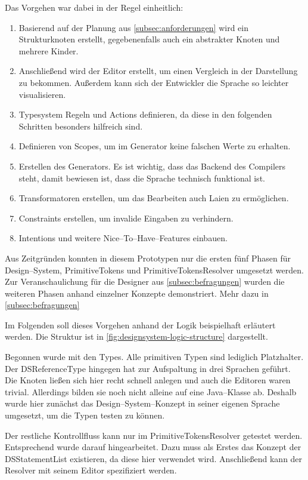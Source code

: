 Das Vorgehen war dabei in der Regel einheitlich:
\begin{enumerate}
    \item Basierend auf der Planung aus \autoref{subsec:anforderungen} wird ein Strukturknoten erstellt, gegebenenfalls auch ein abstrakter Knoten und mehrere Kinder.
    \item Anschließend wird der Editor erstellt, um einen Vergleich in der Darstellung zu bekommen.
    Außerdem kann sich der Entwickler die Sprache so leichter visualisieren.
    \item Typesystem Regeln und Actions definieren, da diese in den folgenden Schritten besonders hilfreich sind.
    \item Definieren von Scopes, um im Generator keine falschen Werte zu erhalten.
    \item Erstellen des Generators.
    Es ist wichtig, dass das Backend des Compilers steht, damit bewiesen ist, dass die Sprache technisch funktional ist.
    \item Transformatoren erstellen, um das Bearbeiten auch Laien zu ermöglichen.
    \item Constraints erstellen, um invalide Eingaben zu verhindern.
    \item Intentions und weitere Nice--To--Have--Features einbauen.
\end{enumerate}

Aus Zeitgründen konnten in diesem Prototypen nur die ersten fünf Phasen für Design--System, PrimitiveTokens und PrimitiveTokensResolver umgesetzt werden.
Zur Veranschaulichung für die Designer aus \autoref{subsec:befragungen} wurden die weiteren Phasen anhand einzelner Konzepte demonstriert.
Mehr dazu in \autoref{subsec:befragungen}

Im Folgenden soll dieses Vorgehen anhand der Logik beispielhaft erläutert werden.
Die Struktur ist in \autoref{fig:designsystem-logic-structure} dargestellt.

Begonnen wurde mit den Types.
Alle primitiven Typen sind lediglich Platzhalter.
Der {\ttfamily DSReferenceType} hingegen hat zur Aufspaltung in drei Sprachen geführt.
Die Knoten ließen sich hier recht schnell anlegen und auch die Editoren waren trivial.
Allerdings bilden sie noch nicht alleine auf eine Java--Klasse ab.
Deshalb wurde hier zunächst das Design--System--Konzept in seiner eigenen Sprache umgesetzt, um die Typen testen zu können.

Der restliche Kontrollfluss kann nur im PrimitiveTokensResolver getestet werden.
Entsprechend wurde darauf hingearbeitet.
Dazu muss als Erstes das Konzept der {\ttfamily DSStatementList} existieren, da diese hier verwendet wird.
Anschließend kann der Resolver mit seinem Editor spezifiziert werden.

